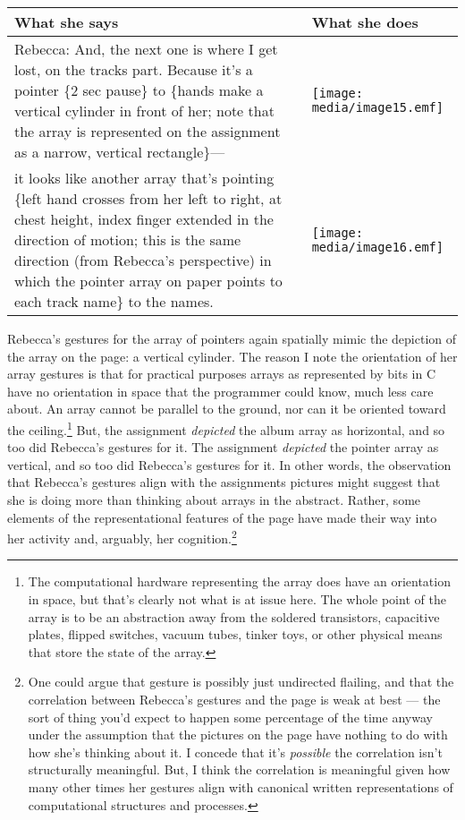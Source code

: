 \begin{longtable}[]{@{}ll@{}}
\toprule
What she says & What she does\tabularnewline
\midrule
\endhead
Rebecca: And, the next one is where I get lost, on the tracks part.
Because it's a pointer \{2 sec pause\} to \{hands make a vertical
cylinder in front of her; note that the array is represented on the
assignment as a narrow, vertical rectangle\}--- &
\texttt{[image: media/image15.emf]}\tabularnewline
it looks like another array that's
\textbar{}\textbar{}pointing\textbar{}\textbar{} \textbar{}\{left hand
crosses from her left to right, at chest height, index finger extended
in the direction of motion; this is the same direction (from Rebecca's
perspective) in which the pointer array on paper points to each track
name\}\textbar{} to the names. &
\texttt{[image: media/image16.emf]}\tabularnewline
\bottomrule
\end{longtable}

Rebecca's gestures for the array of pointers again spatially mimic the
depiction of the array on the page: a vertical cylinder. The reason I
note the orientation of her array gestures is that for practical
purposes arrays as represented by bits in C have no orientation in space
that the programmer could know, much less care about. An array cannot be
parallel to the ground, nor can it be oriented toward the
ceiling.\footnote{The computational hardware representing the array does
  have an orientation in space, but that's clearly not what is at issue
  here. The whole point of the array is to be an abstraction away from
  the soldered transistors, capacitive plates, flipped switches, vacuum
  tubes, tinker toys, or other physical means that store the state of
  the array.} But, the assignment \emph{depicted} the album array as
horizontal, and so too did Rebecca's gestures for it. The assignment
\emph{depicted} the pointer array as vertical, and so too did Rebecca's
gestures for it. In other words, the observation that Rebecca's gestures
align with the assignments pictures might suggest that she is doing more
than thinking about arrays in the abstract. Rather, some elements of the
representational features of the page have made their way into her
activity and, arguably, her cognition.\footnote{One could argue that
  gesture is possibly just undirected flailing, and that the correlation
  between Rebecca's gestures and the page is weak at best --- the sort
  of thing you'd expect to happen some percentage of the time anyway
  under the assumption that the pictures on the page have nothing to do
  with how she's thinking about it. I concede that it's \emph{possible}
  the correlation isn't structurally meaningful. But, I think the
  correlation is meaningful given how many other times her gestures
  align with canonical written representations of computational
  structures and processes.}

